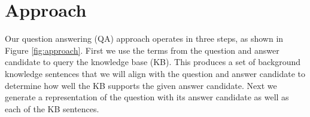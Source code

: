 \section{Approach}
\label{sec:approach}


Our question answering (QA) approach operates in three steps, as shown in Figure \ref{fig:approach}.  First we use the terms from the question and answer candidate to query the knowledge base (KB).  This produces a set of background knowledge sentences that we will align with the question and answer candidate to determine how well the KB supports the given answer candidate.   Next we generate a representation of the question with its answer candidate as well as each of the KB sentences.  